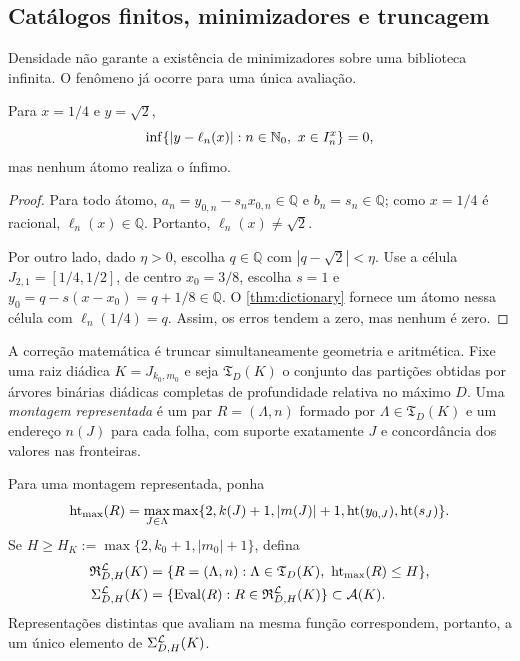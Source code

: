 \subsection{Catálogos finitos, minimizadores e truncagem}

Densidade não garante a existência de minimizadores sobre uma biblioteca
infinita. O fenômeno já ocorre para uma única avaliação.

\begin{proposition}\label{prop:no-minimizer}
Para $x=1/4$ e $y=\sqrt2$,
\[
 \inf\{|y-\ell_n(x)|:n\in\mathbb{N}_0,\ x\in I_n^x\}=0,
\]
mas nenhum átomo realiza o ínfimo.
\end{proposition}

\begin{proof}
Para todo átomo, $a_n=y_{0,n}-s_nx_{0,n}\in\mathbb{Q}$ e
$b_n=s_n\in\mathbb{Q}$; como $x=1/4$ é racional,
$\ell_n(x)\in\mathbb{Q}$. Portanto, $\ell_n(x)\neq\sqrt2$.

Por outro lado, dado $\eta>0$, escolha $q\in\mathbb{Q}$ com
$|q-\sqrt2|<\eta$. Use a célula $J_{2,1}=[1/4,1/2]$, de centro $x_0=3/8$,
escolha $s=1$ e $y_0=q-s(x-x_0)=q+1/8\in\mathbb{Q}$. O
\cref{thm:dictionary} fornece um átomo nessa célula com
$\ell_n(1/4)=q$. Assim, os erros tendem a zero, mas nenhum é zero.
\end{proof}

A correção matemática é truncar simultaneamente geometria e aritmética. Fixe
uma raiz diádica $K=J_{k_0,m_0}$ e seja $\mathfrak T_D(K)$ o conjunto das
partições obtidas por árvores binárias diádicas completas de profundidade
relativa no máximo $D$. Uma \emph{montagem representada} é um par
$R=(\Lambda,n)$ formado por $\Lambda\in\mathfrak T_D(K)$ e um endereço
$n(J)$ para cada folha, com suporte exatamente $J$ e concordância dos valores
nas fronteiras.

\begin{definition}\label{def:finite-catalog}
Para uma montagem representada, ponha
\[
 \operatorname{ht}_{\max}(R)=\max_{J\in\Lambda}
 \max\{2,k(J)+1,|m(J)|+1,\operatorname{ht}(y_{0,J}),\operatorname{ht}(s_J)\}.
\]
Se
$H\ge H_K:=\max\{2,k_0+1,|m_0|+1\}$, defina
\begin{align}
 \mathfrak R_{D,H}^{\mathcal{L}}(K)
   &=\{R=(\Lambda,n):\Lambda\in\mathfrak T_D(K),\
       \operatorname{ht}_{\max}(R)\le H\},\label{eq:represented-catalog}\\
 \Sigma_{D,H}^{\mathcal{L}}(K)
   &=\{\operatorname{Eval}(R):R\in
       \mathfrak R_{D,H}^{\mathcal{L}}(K)\}\subset\mathcal{A}(K).
 \label{eq:finite-catalog}
\end{align}
Representações distintas que avaliam na mesma função correspondem, portanto,
a um único elemento de $\Sigma_{D,H}^{\mathcal{L}}(K)$.
\end{definition}

